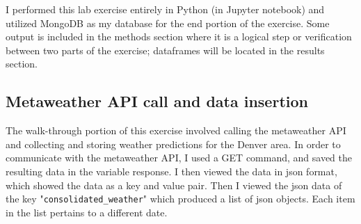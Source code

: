 \documentclass[]{article}
\newcommand{\code}[1]{\colorbox{light-gray}{\texttt{#1}}}
\begin{document}
I performed this lab exercise entirely in Python (in Jupyter notebook) and utilized MongoDB as my database for the end portion of the exercise.  Some output is included in the methods section where it is a logical step or verification between two parts of the exercise; dataframes will be located in the results section.

\subsection{Metaweather API call and data insertion}

The walk-through portion of this exercise involved calling the metaweather API and collecting and storing weather predictions for the Denver area.  In order to communicate with the metaweather API, I used a GET command, and saved the resulting data in the variable response.  I then viewed the data in json format, which showed the data as a key and value pair.  Then I viewed the json data of the key "\code{consolidated\_weather}" which produced a list of json objects.  Each item in the list pertains to a different date.
\end{document}
